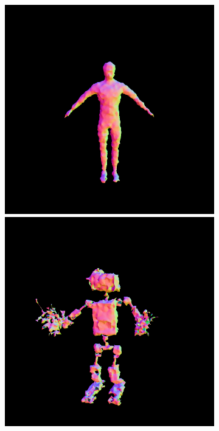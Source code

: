 \begin{figure}[ht]
    \centering
    \begin{subfigure}[b]{0.20\textwidth}
        \centering
        \fontsize{9pt}{7pt}\selectfont{}\vspace{3cm}
        \fontsize{9pt}{7pt}\selectfont{}\vspace{2.85cm}
        \fontsize{9pt}{7pt}\selectfont{}\vspace{1.95cm}
    \end{subfigure}
    \begin{subfigure}[b]{0.20\textwidth}
        \centering
        \includegraphics[width=\textwidth]{figures/appendix/fantasia_coarse_robot_0_part2.png}
        \includegraphics[width=\textwidth]{figures/appendix/fantasia_coarse_robot_5000_part2.png}

\end{subfigure}
\end{figure}
